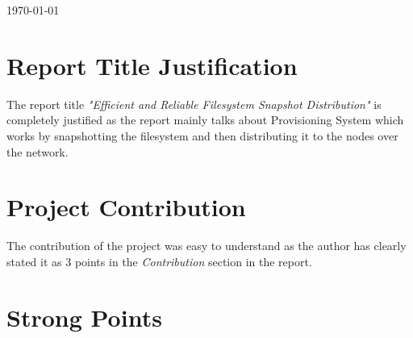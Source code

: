 \documentclass[12pt]{article}
\begin{document}
\begin{titlepage}

{\large \today}\\[3cm] %


 

\vfill %

\end{titlepage}


\section{Report Title Justification}

The report title \textit{"Efficient and Reliable Filesystem Snapshot Distribution"} is completely justified as the report mainly talks about Provisioning System which works by snapshotting the filesystem and then distributing it to the nodes over the network. 

\section{Project Contribution}

The contribution of the project was easy to understand as the author has clearly stated it as 3 points in the \textit{Contribution} section in the report.

\section{Strong Points}
\end{document}
